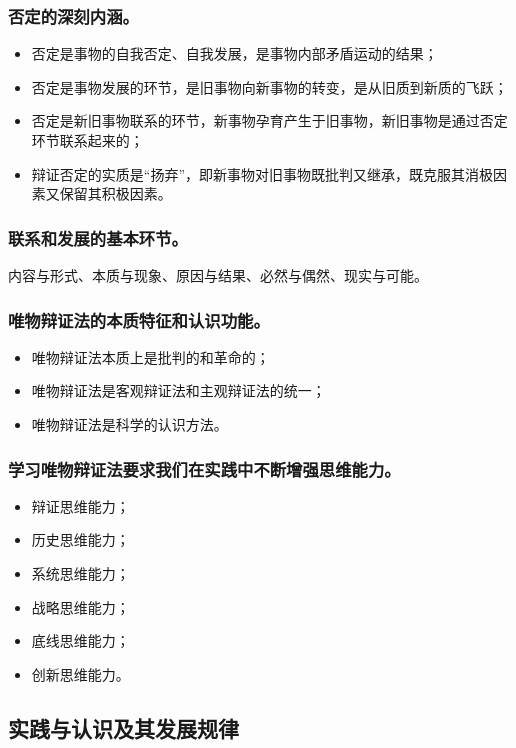 \documentclass{article}
\begin{document}
\subsubsection{否定的深刻内涵。}
\begin{itemize}
    \item 否定是事物的自我否定、自我发展，是事物内部矛盾运动的结果；
    \item 否定是事物发展的环节，是旧事物向新事物的转变，是从旧质到新质的飞跃；
    \item 否定是新旧事物联系的环节，新事物孕育产生于旧事物，新旧事物是通过否定环节联系起来的；
    \item 辩证否定的实质是“扬弃”，即新事物对旧事物既批判又继承，既克服其消极因素又保留其积极因素。
\end{itemize}

\subsubsection{联系和发展的基本环节。}
内容与形式、本质与现象、原因与结果、必然与偶然、现实与可能。

\subsubsection{唯物辩证法的本质特征和认识功能。}
\begin{itemize}
    \item 唯物辩证法本质上是批判的和革命的；
    \item 唯物辩证法是客观辩证法和主观辩证法的统一；
    \item 唯物辩证法是科学的认识方法。
\end{itemize}

\subsubsection{学习唯物辩证法要求我们在实践中不断增强思维能力。}
\begin{itemize}
    \item 辩证思维能力；
    \item 历史思维能力；
    \item 系统思维能力；
    \item 战略思维能力；
    \item 底线思维能力；
    \item 创新思维能力。
\end{itemize}

\subsection{实践与认识及其发展规律}
\end{document}
